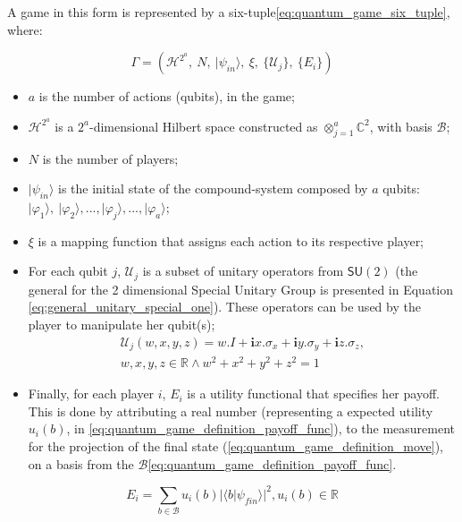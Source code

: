 A game in this
form is represented by a six-tuple\eqref{eq:quantum_game_six_tuple},
where:

\begin{equation}
\Gamma=(\mathcal{H}^{2^{a}},\: N,\:\vert\psi_{in}\rangle,\:\xi,\:\{\mathcal{U}_{j}\},\:\{E_{i}\})\label{eq:quantum_game_six_tuple}
\end{equation}

\begin{itemize}
\item $a$ is the number of actions (qubits), in the game; 
\item $\mathcal{H}^{2^{a}}$ is a $2^{a}$-dimensional Hilbert space constructed
as $\otimes_{j=1}^{a}\mathbb{C}^{2}$, with basis $\mathcal{B}$;
\item $N$ is the number of players;
\item $\vert\psi_{in}\rangle$ is the initial state of the compound-system
composed by $a$ qubits: $\vert\varphi_{1}\rangle,\:\vert\varphi_{2}\rangle, ..., \vert\varphi_{j}\rangle, ..., \vert\varphi_{a}\rangle$;
\item $\xi$ is a mapping function that assigns each action to its respective player;
\item For each qubit $j$, $\mathcal{U}_{j}$ is a subset of unitary operators from $\mathsf{SU}(2)$ (the general for the 2 dimensional Special Unitary Group is presented in Equation \eqref{eq:general_unitary_special_one}).
These operators can be used by the player to manipulate her qubit(s);
\begin{equation}
\begin{split}
\mathcal{U}_{j}(w,x,y,z)=w.I + \mathbf{i}x.\sigma_{x} + \mathbf{i}y.\sigma_{y} + \mathbf{i}z.\sigma_{z}, \\  w,x,y,z \in \mathbb{R} \wedge  
w^2 + x^2 + y^2 + z^2 =1 
\end{split}
\label{eq:general_unitary_special_one}
\end{equation}
\item Finally, for each player $i$, $E_{i}$ is a utility functional that
specifies her payoff. This is done by attributing a real number (representing a expected utility $ u_{i}(b)$, in \eqref{eq:quantum_game_definition_payoff_func}), to the measurement for the projection of the final state (\eqref{eq:quantum_game_definition_move}), on a basis from the $\mathcal{B}$\eqref{eq:quantum_game_definition_payoff_func}.\end{itemize}



\begin{equation}
E_{i}=\sum_{b \in \mathcal{B}} u_{i}(b)\vert \langle b\vert \psi_{fin}\rangle\vert^{2}, u_{i}(b) \in \mathbb{R}
\label{eq:quantum_game_definition_payoff_func}
\end{equation}

